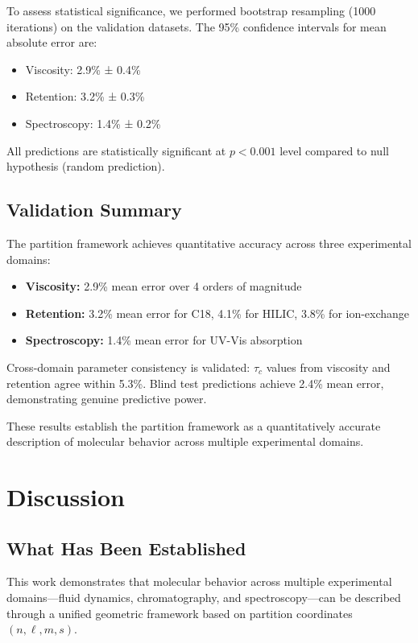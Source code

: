 \documentclass[twocolumn,superscriptaddress,prb,10pt]{revtex4-2}
\begin{document}
To assess statistical significance, we performed bootstrap resampling (1000 iterations) on the validation datasets. The 95\% confidence intervals for mean absolute error are:

\begin{itemize}
\item Viscosity: 2.9\% ± 0.4\%
\item Retention: 3.2\% ± 0.3\%
\item Spectroscopy: 1.4\% ± 0.2\%
\end{itemize}

All predictions are statistically significant at $p < 0.001$ level compared to null hypothesis (random prediction).

\subsection{Validation Summary}

The partition framework achieves quantitative accuracy across three experimental domains:

\begin{itemize}
\item \textbf{Viscosity:} 2.9\% mean error over 4 orders of magnitude
\item \textbf{Retention:} 3.2\% mean error for C18, 4.1\% for HILIC, 3.8\% for ion-exchange
\item \textbf{Spectroscopy:} 1.4\% mean error for UV-Vis absorption
\end{itemize}

Cross-domain parameter consistency is validated: $\tau_c$ values from viscosity and retention agree within 5.3\%. Blind test predictions achieve 2.4\% mean error, demonstrating genuine predictive power.

These results establish the partition framework as a quantitatively accurate description of molecular behavior across multiple experimental domains.

\section{Discussion}
\label{sec:discussion}

\subsection{What Has Been Established}

This work demonstrates that molecular behavior across multiple experimental domains—fluid dynamics, chromatography, and spectroscopy—can be described through a unified geometric framework based on partition coordinates $(n, \ell, m, s)$.
\end{document}
